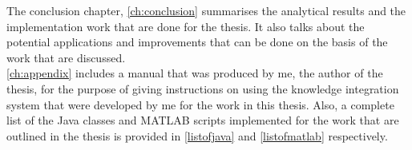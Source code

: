 \newline
The conclusion chapter, \autoref{ch:conclusion} summarises the analytical results and the implementation work that are done for the thesis. It also talks about the potential applications and improvements that can be done on the basis of the work that are discussed.\\
\newline
\autoref{ch:appendix} includes a manual that was produced by me, the author of the thesis, for the purpose of giving instructions on using the knowledge integration system that were developed by me for the work in this thesis. Also, a complete list of the Java classes and MATLAB scripts implemented for the work that are outlined in the thesis is provided in \ref{listofjava} and \ref{listofmatlab} respectively.